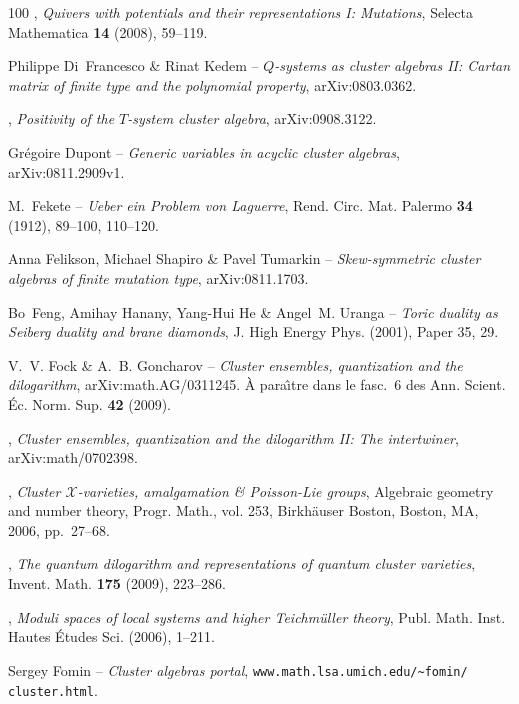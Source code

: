 \documentclass[brochure,12pt]{bourbaki}
\numberwithin{equation}{subsection}
\numberwithin{theorem}{section}
\newcommand{\scr}{\mathcal}
\begin{document}
\begin{thebibliography}{100}
\bysame, \emph{Quivers with potentials and their representations {I}:
  {Mutations}}, Selecta Mathematica \textbf{14} (2008), 59--119.

{\sc Philippe Di~Francesco \& Rinat Kedem} -- \emph{{$Q$}-systems as cluster algebras
  {II}: Cartan matrix of finite type and the polynomial property},
  arXiv:0803.0362.

\bysame, \emph{Positivity of the {$T$}-system
cluster algebra}, arXiv:0908.3122.


{\sc Gr\'egoire Dupont} -- \emph{Generic variables in acyclic cluster algebras},
  arXiv:0811.2909v1.


{\sc M.~Fekete} -- \emph{Ueber ein {P}roblem von {L}aguerre}, Rend. Circ. Mat. Palermo
  \textbf{34} (1912), 89--100, 110--120.

{\sc Anna Felikson, Michael Shapiro \& Pavel Tumarkin} -- \emph{Skew-symmetric
  cluster algebras of finite mutation type}, arXiv:0811.1703.

{\sc Bo~Feng, Amihay Hanany, Yang-Hui He \& Angel~M. Uranga} -- \emph{Toric duality
  as {S}eiberg duality and brane diamonds}, J. High Energy Phys. (2001),
 Paper 35, 29.

{\sc V.~V. Fock \& A.~B. Goncharov} -- \emph{{Cluster ensembles, quantization and the
  dilogarithm}}, arXiv:math.AG/0311245. \`A para\^\i tre dans le fasc.~6 des Ann. Scient.
 \'Ec. Norm. Sup.   \textbf{42} (2009).

\bysame, \emph{Cluster ensembles, quantization and the dilogarithm {II}: The
  intertwiner}, arXiv:math/0702398.

\bysame, \emph{Cluster {$\scr X$}-varieties,
  amalgamation \& {P}oisson-{L}ie groups}, Algebraic geometry and number
  theory, Progr. Math., vol. 253, Birkh\"auser Boston, Boston, MA, 2006,
  pp.~27--68.

\bysame, \emph{The quantum dilogarithm and representations of quantum cluster
  varieties}, Invent. Math. \textbf{175} (2009), 223--286.

\bysame, \emph{Moduli spaces of local systems and
  higher {T}eichm\"uller theory}, Publ. Math. Inst. Hautes \'Etudes Sci.
  (2006), 1--211.

{\sc Sergey Fomin} -- \emph{Cluster algebras portal},
  \verb"www.math.lsa.umich.edu/~fomin/" \verb"cluster.html".


\end{thebibliography}
\end{document}
